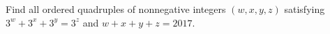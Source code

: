 Find all ordered quadruples of nonnegative integers $(w,x,y,z)$ satisfying $3^w+3^x+3^y=3^z$ and $w+x+y+z=2017$.
